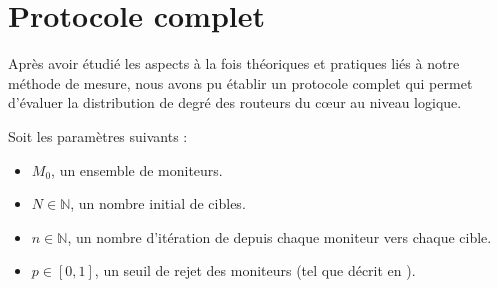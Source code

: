 \section{Protocole complet}
\label{sec:traceroute-protocol}

Après avoir étudié les aspects à la fois théoriques et pratiques liés à notre
méthode de mesure, nous avons pu établir un protocole complet qui permet
d'évaluer la distribution de degré des routeurs du c\oe{}ur au niveau logique.

Soit les paramètres suivants :
\begin{itemize}
  \item $M_0$, un ensemble de moniteurs.
  \item $N \in \mathbb{N}$, un nombre initial de cibles.
  \item $n \in \mathbb{N}$, un nombre d'itération de \traceroute depuis chaque
  moniteur vers chaque cible.
  \item $p \in [0, 1]$, un seuil de rejet des moniteurs (tel que décrit en
  ).
\end{itemize}

